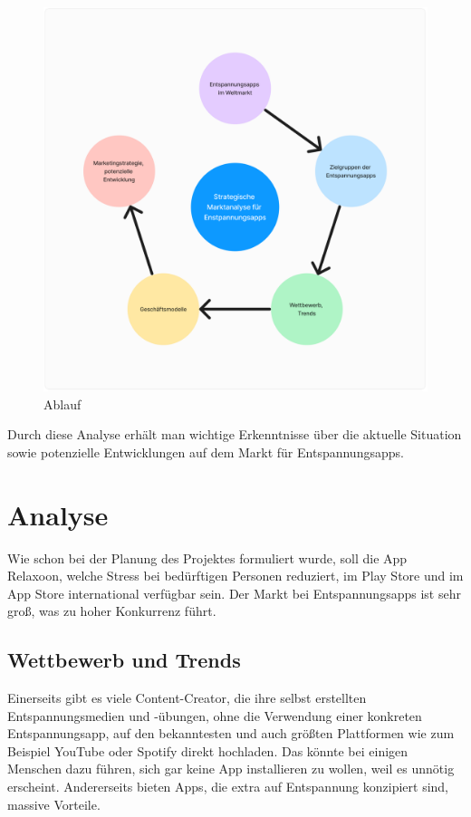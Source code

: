 \begin{figure}[H]
    \centering
    \includegraphics[height=\textwidth]{./pics/Marktanalyse-Relaxoon.png}
    \caption{Ablauf}
\end{figure}

Durch diese Analyse erhält man wichtige Erkenntnisse über die aktuelle Situation sowie potenzielle Entwicklungen
auf dem Markt für Entspannungsapps.


\section{Analyse}

Wie schon bei der Planung des Projektes formuliert wurde, soll die App Relaxoon, welche Stress bei bedürftigen 
Personen reduziert, im Play Store und im App Store 
international verfügbar sein. Der Markt bei Entspannungsapps
ist sehr groß, was zu hoher Konkurrenz führt. 

\subsection{Wettbewerb und Trends}

Einerseits gibt es viele Content-Creator, die ihre selbst erstellten Entspannungsmedien und -übungen, 
ohne die Verwendung einer konkreten 
Entspannungsapp, auf den bekanntesten und
auch größten Plattformen wie zum Beispiel YouTube oder Spotify direkt hochladen.
Das könnte bei einigen Menschen dazu führen, sich gar keine App installieren zu wollen, weil es unnötig erscheint.
Andererseits bieten Apps, die extra auf Entspannung konzipiert sind, massive Vorteile. 

